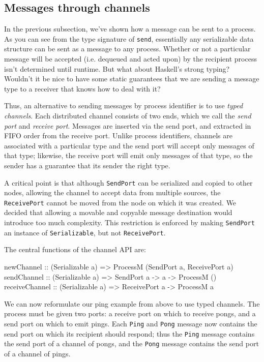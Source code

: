 \documentclass[preprint]{sigplanconf}
\begin{document}
\subsection{Messages through channels}
In the previous subsection, we've shown how a message can be sent to a process. As you can see from the type signature of \texttt{send}, essentially any serializable data structure can be sent as a message to any process. Whether or not a particular message will be accepted (i.e. dequeued and acted upon) by the recipient process isn't determined until runtime. But what about Haskell's strong typing? Wouldn't it be nice to have some static guarantees that we are sending a message type to a receiver that knows how to deal with it?

Thus, an alternative to sending messages by process identifier is to use {\em typed channels}. Each distributed channel consists of two ends, which we call the {\em send port} and {\em receive port}. Messages are inserted via the send port, and extracted in FIFO order from the receive port. Unlike process identifiers, channels are associated with a particular type and the send port will accept only messages of that type; likewise, the receive port will emit only messages of that type, so the sender has a guarantee that its sender the right type.

A critical point is that although \texttt{SendPort} can be serialized and copied to other nodes, allowing the channel to accept data from multiple sources, the \texttt{ReceivePort} cannot be moved from the node on which it was created. We decided that allowing a movable and copyable message destination would introduce too much complexity. This restriction is enforced by making \texttt{SendPort} an instance of \texttt{Serializable}, but not \texttt{ReceivePort}. 

The central functions of the channel API are:

\begin{code}
newChannel :: (Serializable a) => ProcessM (SendPort a, ReceivePort a)
sendChannel :: (Serializable a) => SendPort a -> a -> ProcessM ()
receiveChannel :: (Serializable a) => ReceivePort a -> ProcessM a
\end{code}


We can now reformulate our ping example from above to use typed channels. The process must be given two ports: a receive port on which to receive pongs, and a send port on which to emit pings. Each \texttt{Ping} and \texttt{Pong} message now contains the send port on which its recipient should respond; thus the \texttt{Ping} message contains the send port of a channel of pongs, and the \texttt{Pong} message contains the send port of a channel of pings.
\end{document}
